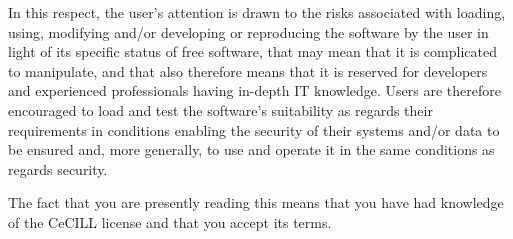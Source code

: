 In this respect, the user's attention is drawn to the risks associated
with loading, using, modifying and/or developing or reproducing the
software by the user in light of its specific status of free software,
that may mean that it is complicated to manipulate, and that also
therefore means that it is reserved for developers and experienced
professionals having in-depth IT knowledge. Users are therefore
encouraged to load and test the software's suitability as regards their
requirements in conditions enabling the security of their systems and/or
data to be ensured and, more generally, to use and operate it in the
same conditions as regards security.

The fact that you are presently reading this means that you have had
knowledge of the CeCILL license and that you accept its terms.
